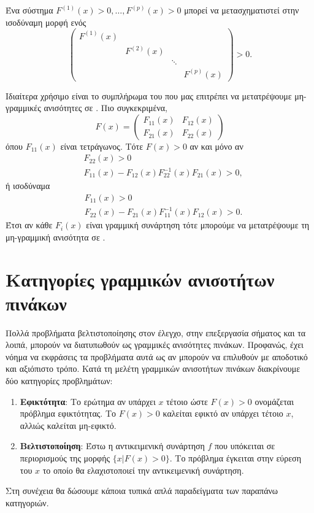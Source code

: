 Ένα σύστημα  \( F^{(1)}(x) > 0, \dots, F^{(p)}(x) > 0 \) μπορεί να
μετασχηματιστεί στην ισοδύναμη μορφή ενός 
\begin{equation*}
    \begin{pmatrix}
        F^{(1)}(x) & {} & {} & {}\\
        {} & F^{(2)}(x) & {} & {}\\
        {} & {} & \ddots & {} \\
        {} & {} & {} & F^{(p)}(x)
    \end{pmatrix} > 0.
\end{equation*}

Ιδιαίτερα χρήσιμο είναι το συμπλήρωμα του  που μας επιτρέπει να
μετατρέψουμε μη-γραμμικές ανισότητες σε . Πιο συγκεκριμένα,
\begin{equation*}
    F(x) = 
    \begin{pmatrix}
        F_{11}(x) & F_{12}(x) \\
        F_{21}(x) & F_{22}(x) 
    \end{pmatrix}
\end{equation*}
όπου \(F_{11}(x)\) είναι τετράγωνος. Τότε \(F(x) > 0\) αν και μόνο αν
\begin{align*}
    &F_{22}(x) > 0 \\
    &F_{11}(x) - F_{12}(x)F_{22}^{-1}(x)F_{21}(x) > 0,
\end{align*}
ή ισοδύναμα
\begin{align*}
    &F_{11}(x) > 0 \\
    &F_{22}(x) - F_{21}(x)F_{11}^{-1}(x)F_{12}(x) > 0.
\end{align*}
Έτσι αν κάθε \(F_i(x)\) είναι γραμμική συνάρτηση τότε μπορούμε να μετατρέψουμε
τη μη-γραμμική ανισότητα σε .

\section{Κατηγορίες γραμμικών ανισοτήτων πινάκων}
Πολλά προβλήματα βελτιστοποίησης στον έλεγχο, στην επεξεργασία σήματος και τα
λοιπά, μπορούν να διατυπωθούν ως γραμμικές ανισότητες πινάκων. Προφανώς, έχει
νόημα να εκφράσεις τα προβλήματα αυτά ως  αν μπορούν να επιλυθούν με
αποδοτικό και αξιόπιστο τρόπο. Κατά τη μελέτη γραμμικών ανισοτήτων πινάκων
διακρίνουμε δύο κατηγορίες προβλημάτων:
\begin{enumerate}
    \item \textbf{Εφικτότητα}: Το ερώτημα αν υπάρχει \(x\) τέτοιο ώστε \(F(x) >
        0 \) ονομάζεται πρόβλημα εφικτότητας. Το  \(F(x) > 0 \)
        καλείται εφικτό αν υπάρχει τέτοιο \(x\), αλλιώς καλείται μη-εφικτό.
    \item \textbf{Βελτιστοποίηση}: Έστω η αντικειμενική συνάρτηση \(f\) που
        υπόκειται σε περιορισμούς της μορφής \( \{ x | F(x) > 0 \} \). Το
        πρόβλημα έγκειται στην εύρεση του \(x\) το οποίο θα ελαχιστοποιεί την
        αντικειμενική συνάρτηση.
\end{enumerate}
Στη συνέχεια θα δώσουμε κάποια τυπικά απλά παραδείγματα των παραπάνω
κατηγοριών.

